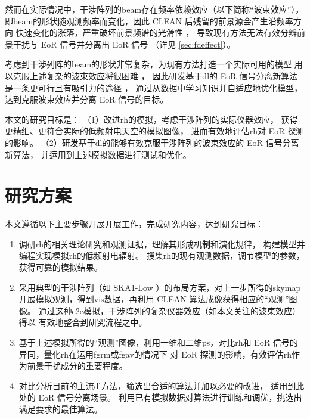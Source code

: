 \begin{itemize}
然而在实际情况中，干涉阵列的\ac{beam}存在频率依赖效应（以下简称“波束效应”），
即\acl{beam}的形状随观测频率而变化，因此 CLEAN 后残留的前景源会产生沿频率方向
快速变化的涨落，严重破坏前景频谱的光滑性 \cite{liu2009ps}，
导致现有方法无法有效分辨前景干扰与 EoR 信号并分离出 EoR 信号
（详见 \autoref{sec:fdeffect}）。

考虑到干涉列阵的\acl{beam}的形状非常复杂，为现有方法打造一个实际可用的模型
用以克服上述复杂的波束效应将很困难 \cite{lochner2015}，
因此研发基于\ac{dl}的 EoR 信号分离新算法是一条更可行且有吸引力的途径
\cite{herbel2018,vafaeiSadr2018}，
通过从数据中学习知识并自适应地优化模型，达到克服波束效应并分离 EoR 信号的目标。

\end{itemize}

本文的研究目标是：
（1）改进\acl{rh}的模拟，考虑干涉阵列的实际仪器效应，
获得更精细、更符合实际的低频射电天空的模拟图像，
进而有效地评估\acl{rh}对 EoR 探测的影响。
（2）研发基于\ac{dl}的能够有效克服干涉阵列的波束效应的 EoR 信号分离新算法，
并运用到上述模拟数据进行测试和优化。


\section{研究方案}
\label{sec:plan}

本文遵循以下主要步骤开展开展工作，完成研究内容，达到研究目标：
\begin{enumerate}
\item
调研\acl{rh}的相关理论研究和观测证据，理解其形成机制和演化规律，
构建模型并编程实现模拟\acl{rh}的低频射电辐射。
搜集\acl{rh}的现有观测数据，调节模型的参数，获得可靠的模拟结果。

\item
采用典型的干涉阵列（如 SKA1-Low ）的布局方案，对上一步所得的\ac{skymap}
开展模拟观测，得到\ac{vis}数据，再利用 CLEAN 算法成像获得相应的“观测”图像。
通过这种\ac{e2e}模拟，干涉阵列的复杂仪器效应（如本文关注的波束效应）得以
有效地整合到研究流程之中。

\item
基于上述模拟所得的“观测”图像，利用一维和二维\ac{ps}，对比\acl{rh}和
EoR 信号的异同，量化\acl{rh}在运用\acl{fgrm}或\acl{fgav}的情况下
对 EoR 探测的影响，有效评估\acl{rh}作为前景干扰成分的重要程度。

\item
对比分析目前的主流\acl{dl}方法，筛选出合适的算法并加以必要的改进，
适用到此处的 EoR 信号分离场景。
利用已有模拟数据对算法进行训练和调优，挑选出满足要求的最佳算法。

\end{enumerate}


